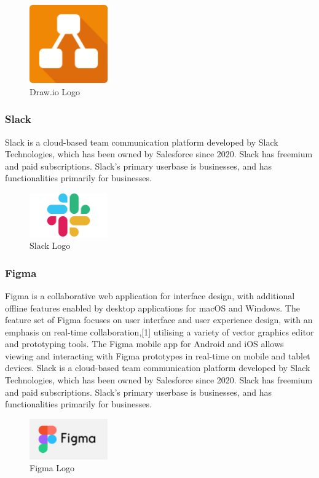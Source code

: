 \begin{figure}[h!]
      \centering
      \includegraphics[width=0.3\textwidth]{images/drawio.png}
      \caption{Draw.io Logo}
      \label{fig:drawio}



\end{figure}
\newpage
\subsubsection{Slack}
Slack is a cloud-based team communication platform developed by Slack Technologies, which has been owned by Salesforce since 2020. Slack has freemium and paid subscriptions. Slack's primary userbase is businesses, and has functionalities primarily for businesses.
\begin{figure}[h!]
      \centering
      \includegraphics[width=0.3\textwidth]{images/slack.jpg}
      \caption{Slack Logo}
      \label{fig:Slack}
\end{figure}
\subsubsection{Figma}
Figma is a collaborative web application for interface design, with additional offline features enabled by desktop applications for macOS and Windows. The feature set of Figma focuses on user interface and user experience design, with an emphasis on real-time collaboration,[1] utilising a variety of vector graphics editor and prototyping tools. The Figma mobile app for Android and iOS allows viewing and interacting with Figma prototypes in real-time on mobile and tablet devices.
Slack is a cloud-based team communication platform developed by Slack Technologies, which has been owned by Salesforce since 2020. Slack has freemium and paid subscriptions. Slack's primary userbase is businesses, and has functionalities primarily for businesses.
\begin{figure}[h!]
      \centering
      \includegraphics[width=0.3\textwidth]{images/figma.png}
      \caption{Figma Logo}
      \label{fig:Figma}
\end{figure}

